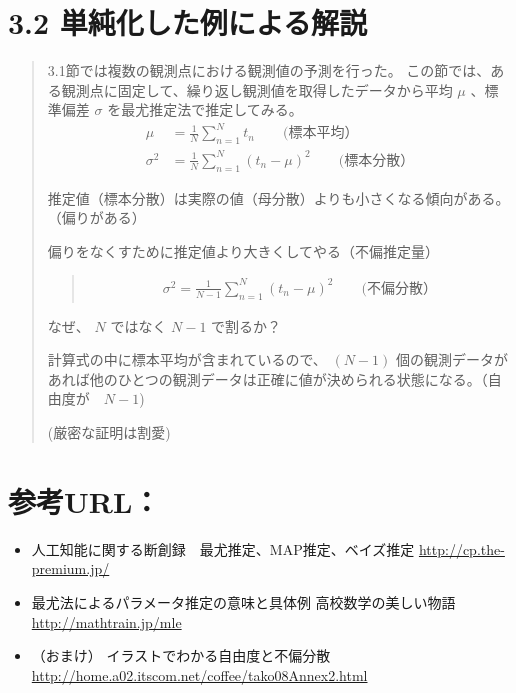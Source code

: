 \documentclass[letterpaper,10pt,dvipdfmx]{sphinxmanual}
\begin{document}
\section{3.2 単純化した例による解説}
\label{Chapter_3_MLE:id7}\begin{quote}

3.1節では複数の観測点における観測値の予測を行った。
この節では、ある観測点に固定して、繰り返し観測値を取得したデータから平均 \(\mu\) 、標準偏差 \(\sigma\) を最尤推定法で推定してみる。
\begin{equation*}
\begin{split}\mu &= \frac{1}{N} \sum_{n=1}^{N} t_n   \qquad (標本平均） \\
\sigma^2 &= \frac{1}{N} \sum_{n=1}^{N} ( t_n - \mu)^2　　\qquad (標本分散）\end{split}
\end{equation*}
\noindent{}

推定値（標本分散）は実際の値（母分散）よりも小さくなる傾向がある。（偏りがある）

偏りをなくすために推定値より大きくしてやる（不偏推定量）
\begin{quote}
\begin{equation*}
\begin{split}\sigma^2 = \frac{1}{N-1} \sum_{n=1}^{N} ( t_n - \mu)^2　　\qquad (不偏分散）\end{split}
\end{equation*}\end{quote}

なぜ、 \(N\) ではなく \(N-1\) で割るか？

計算式の中に標本平均が含まれているので、 \((N-1)\) 個の観測データがあれば他のひとつの観測データは正確に値が決められる状態になる。（自由度が　\(N-1\))

(厳密な証明は割愛)
\end{quote}


\section{参考URL：}
\label{Chapter_3_MLE:url}\begin{itemize}
\item {} 
人工知能に関する断創録　最尤推定、MAP推定、ベイズ推定 \url{http://cp.the-premium.jp/}

\item {} 
最尤法によるパラメータ推定の意味と具体例 \textbar{} 高校数学の美しい物語 \url{http://mathtrain.jp/mle}

\item {} 
（おまけ） イラストでわかる自由度と不偏分散 \url{http://home.a02.itscom.net/coffee/tako08Annex2.html}

\end{itemize}
\end{document}
